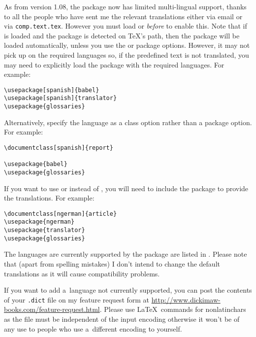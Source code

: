 \documentclass[report,inlinetitle]{nlctdoc}
\begin{document}
As from version 1.08, the  package now has
limited multi-lingual support, thanks to all the people who have sent
me the relevant translations either via email or via 
\texttt{comp.text.tex}.
However you must load  or  \emph{before} 
 to enable this. Note that if  is loaded 
and the  package is detected on \TeX's path, then the
 package will be loaded automatically, unless you
use the  or 
package options.  However,
it may not pick up on the required languages so, if the predefined
text is not translated, you may need to explicitly load the
 package with the required languages. For example:
\begin{verbatim}
\usepackage[spanish]{babel}
\usepackage[spanish]{translator}
\usepackage{glossaries}
\end{verbatim}
Alternatively, specify the language as a class option rather
than a package option. For example:
\begin{verbatim}
\documentclass[spanish]{report}

\usepackage{babel}
\usepackage{glossaries}
\end{verbatim}

If you want to use  or  instead
of , you will need to include the  package 
to provide the translations. For example:
\begin{verbatim}
\documentclass[ngerman]{article}
\usepackage{ngerman}
\usepackage{translator}
\usepackage{glossaries}
\end{verbatim}

The languages are currently supported by the
 package are listed in
. Please note that (apart from
spelling mistakes) I don't intend to change the default translations
as it will cause compatibility problems.

If you want to add a~language not currently supported, you can post 
the contents of your \texttt{.dict} file on my feature request form
at \url{http://www.dickimaw-books.com/feature-request.html}. Please
use \LaTeX\ commands for \glspl{nonlatinchar} as the file must be
independent of the input encoding otherwise it won't be of any use
to people who use a~different encoding to yourself.
\end{document}
